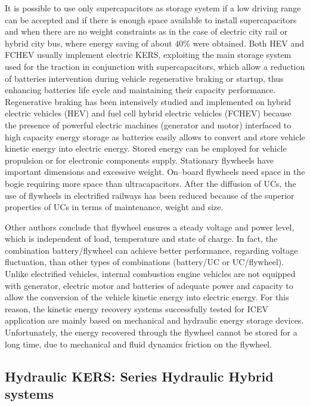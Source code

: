 \documentclass[11pt]{article}
\begin{document}
It is possible to use only supercapacitors as storage system if a low driving range can be accepted and if there is enough space available to install supercapacitors and when there are no weight constraints as in the case of electric city rail or hybrid city bus, where energy saving of about $40\%$ were obtained. Both HEV and FCHEV usually implement electric KERS, exploiting the main storage system used for the traction in conjunction with supercapacitors, which allow a reduction of batteries intervention during vehicle regenerative braking or startup, thus enhancing batteries life cycle and maintaining their capacity performance. Regenerative braking has been intensively studied and implemented on hybrid electric vehicles (HEV) and fuel cell hybrid electric vehicles (FCHEV) because the presence of powerful electric machines (generator and motor) interfaced to high capacity energy storage as batteries easily allows to convert and store vehicle kinetic energy into electric energy. Stored energy can be employed for vehicle propulsion or for electronic components supply.  Stationary flywheels have important dimensions and excessive weight. On--board flywheels need space in the bogie requiring more space than ultracapacitors. After the diffusion of UCs, the use of flywheels in electrified railways has been reduced because of the superior properties of UCs in terms of maintenance, weight and size.

Other authors conclude that flywheel ensures a steady voltage and power level, which is independent of load, temperature and state of charge. In fact, the combination battery/flywheel can achieve better performance, regarding voltage fluctuation, than other types of combinations (battery/UC or UC/flywheel). Unlike electrified vehicles, internal combustion engine vehicles are not equipped with generator, electric motor and batteries of adequate power and capacity to allow the conversion of the vehicle kinetic energy into electric energy. For this reason, the kinetic energy recovery systems successfully tested for ICEV application are mainly based on mechanical and hydraulic energy storage devices. Unfortunately, the energy recovered through the flywheel cannot be stored for a long time, due to mechanical and fluid dynamics friction on the flywheel.
 

\subsection{Hydraulic KERS: Series Hydraulic Hybrid systems}
\end{document}
